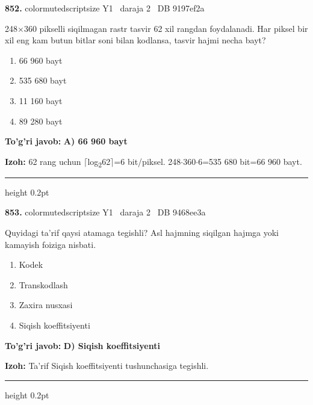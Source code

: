 \documentclass[10pt,a4paper,oneside]{article}
\begin{document}
\noindent\textbf{\color{ink}852.}  {color{muted}scriptsize Y1 \textbullet\ daraja 2 \textbullet\ DB 9197ef2a}
\par
248\ensuremath{\times}360 pikselli siqilmagan rastr tasvir 62 xil rangdan foydalanadi. Har piksel bir xil eng kam butun bitlar soni bilan kodlansa, tasvir hajmi necha bayt?
\begin{enumerate}[label=\Alph*),leftmargin=9mm]
\item 66 960 bayt
\item 535 680 bayt
\item 11 160 bayt
\item 89 280 bayt
\end{enumerate}
\begin{tcolorbox}[enhanced,breakable,colback=teal!4,colframe=teal!50!black,boxrule=0.5pt,arc=1.1mm,left=3mm,right=3mm,top=1.7mm,bottom=1.7mm,before skip=2mm,after skip=2mm]
\textbf{\color{teal}To'g'ri javob:} \textbf{A) 66 960 bayt}
\par\smallskip
\textbf{Izoh:} 62 rang uchun \ensuremath{\lceil}log\textsubscript{2}62\ensuremath{\rceil}=6 bit/piksel. 248\ensuremath{\cdot}360\ensuremath{\cdot}6=535 680 bit=66 960 bayt.
\end{tcolorbox}
\vspace{2mm}\hrule height 0.2pt \vspace{3mm}

\noindent\textbf{\color{ink}853.}  {color{muted}scriptsize Y1 \textbullet\ daraja 2 \textbullet\ DB 9468ee3a}
\par
Quyidagi ta'rif qaysi atamaga tegishli? Asl hajmning siqilgan hajmga yoki kamayish foiziga nisbati.
\begin{enumerate}[label=\Alph*),leftmargin=9mm]
\item Kodek
\item Transkodlash
\item Zaxira nusxasi
\item Siqish koeffitsiyenti
\end{enumerate}
\begin{tcolorbox}[enhanced,breakable,colback=teal!4,colframe=teal!50!black,boxrule=0.5pt,arc=1.1mm,left=3mm,right=3mm,top=1.7mm,bottom=1.7mm,before skip=2mm,after skip=2mm]
\textbf{\color{teal}To'g'ri javob:} \textbf{D) Siqish koeffitsiyenti}
\par\smallskip
\textbf{Izoh:} Ta'rif Siqish koeffitsiyenti tushunchasiga tegishli.
\end{tcolorbox}
\vspace{2mm}\hrule height 0.2pt \vspace{3mm}
\end{document}
